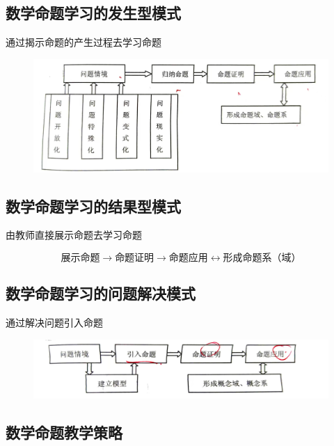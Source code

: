 \subsection{数学命题学习的发生型模式}

通过揭示命题的产生过程去学习命题

\begin{figure}[H]
    \centering
    \includegraphics[width=0.5\linewidth]{image/fashengxingmoshi.jpg}
\end{figure}

\subsection{数学命题学习的结果型模式}

由教师直接展示命题去学习命题

\[
\text{展示命题}\xrightarrow{}\text{命题证明}\xrightarrow{}\text{命题应用}\longleftrightarrow\text{形成命题系（域）}
\]

\subsection{数学命题学习的问题解决模式}

通过解决问题引入命题

\begin{figure}[H]
    \centering
    \includegraphics[width=0.5\linewidth]{image/wentijiejuemoshi.jpg}
\end{figure}


\subsection{数学命题教学策略}

